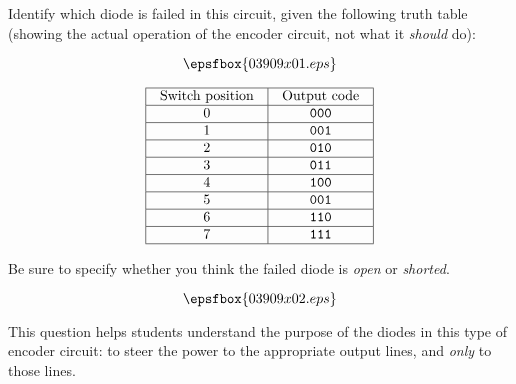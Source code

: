 

Identify which diode is failed in this circuit, given the following truth table (showing the actual operation of the encoder circuit, not what it {\it should} do):

$$\epsfbox{03909x01.eps}$$


$$\vbox{\offinterlineskip
\halign{\strut
\vrule \quad\hfil # \ \hfil & 
\vrule \quad\hfil # \ \hfil \vrule \cr
\noalign{\hrule}
%
Switch position & Output code \cr
%
\noalign{\hrule}
%
0 & {\tt 000} \cr
%
\noalign{\hrule}
%
1 & {\tt 001} \cr
%
\noalign{\hrule}
%
2 & {\tt 010} \cr
%
\noalign{\hrule}
%
3 & {\tt 011} \cr
%
\noalign{\hrule}
%
4 & {\tt 100} \cr
%
\noalign{\hrule}
%
5 & {\tt 001} \cr
%
\noalign{\hrule}
%
6 & {\tt 110} \cr
%
\noalign{\hrule}
%
7 & {\tt 111} \cr
%
\noalign{\hrule}
} %
}$$ %

Be sure to specify whether you think the failed diode is {\it open} or {\it shorted}.







$$\epsfbox{03909x02.eps}$$







This question helps students understand the purpose of the diodes in this type of encoder circuit: to steer the power to the appropriate output lines, and {\it only} to those lines.




